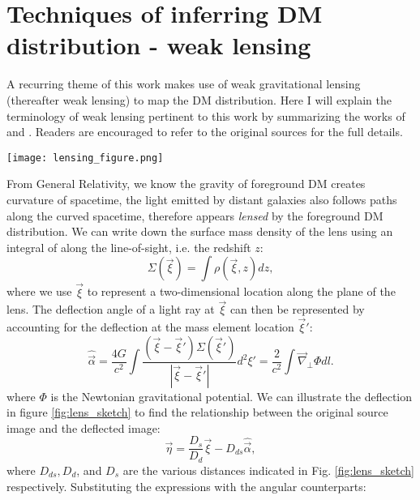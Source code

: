 \section{Techniques of inferring DM distribution - weak lensing}
A recurring theme of this work makes use of weak gravitational lensing
(thereafter weak lensing) to map
the DM distribution. Here I will explain the terminology of weak lensing
pertinent to this work by summarizing the works of \citet{Narayan1996}
and \citet{Bartelmann2001a}. Readers are encouraged to refer to the original 
sources for the full details. 
\begin{figure*}[h]
	\begin{center}
	\texttt{[image: lensing\_figure.png]}
	\caption{The sketch of a gravitational lens system created by Michael Sachs,
		under the [CC BY-SA 3.0
	(http://creativecommons.org/licenses/by-sa/3.0) or GFDL
(http://www.gnu.org/copyleft/fdl.html)] license, via Wikimedia Commons.	\label{fig:lens_sketch}
	}
	\end{center}
\end{figure*}
	From General Relativity, we know the gravity of foreground DM creates 
curvature of spacetime, the light emitted by distant galaxies
also follows paths along the curved spacetime, therefore appears {\it
lensed} by the foreground DM distribution. 
 We can write down the surface mass density of the lens
using an integral of along the line-of-sight, i.e. the redshift $z$: 
\begin{equation}
	\Sigma(\vec{\xi}) = \int \rho(\vec{\xi}, z) dz,
\end{equation}
where we use $\vec{\xi}$ to represent a two-dimensional location along the
plane of the lens.
The deflection angle of a light ray at $\vec{\xi}$ can then be represented by
accounting for the deflection at the mass element location
$\vec{\xi}'$:
\begin{equation}
	\hat{\vec{\alpha}} = \frac{4G}{c^2}\int \frac{(\vec{\xi} -
	\vec{\xi}')\Sigma(\vec{\xi}')}{|\vec{\xi} -\vec{\xi}'|} d^2\xi'
= \frac{2}{c^2}\int \vec{\nabla}_\perp \Phi dl.
\end{equation}
where $\Phi$ is the Newtonian gravitational potential.
We can illustrate the deflection in
figure \ref{fig:lens_sketch} to find the relationship between the original
source image and the deflected image:
\begin{equation}
	\vec{\eta} = \frac{D_s}{D_d}\vec{\xi} - D_{ds} \hat{\vec{\alpha}},
\end{equation}
where $D_{ds}, D_d$, and $D_s$ are the various distances indicated in 
Fig. \ref{fig:lens_sketch} respectively.
Substituting the expressions with the angular counterparts:

